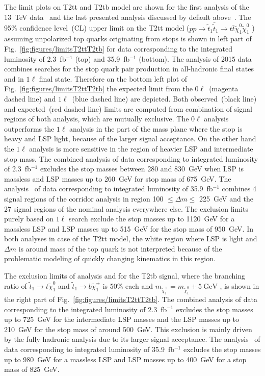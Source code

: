 The limit plots on T2tt and T2tb model are shown for the first analysis of the 13~TeV data~\cite{Sirunyan:2016jpr} and the last presented analysis discussed by default above~\cite{Sirunyan:2017xse}. The 95\% confidence level~(CL) upper limit on the T2tt model ($ pp \to \tilde{t}_{1} \bar{\tilde{t}}_{1} \to t \bar{t} \tilde{\chi}^{0}_{1} \tilde{\chi}^{0}_{1}$ ) assuming unpolarized top quarks originating from stops is shown in left part of Fig.~\ref{fig:figures/limitsT2ttT2tb} for data corresponding to the integrated luminosity of 2.3~fb$^{-1}$ (top) and 35.9~fb$^{-1}$ (bottom). The analysis of 2015 data~\cite{Sirunyan:2016jpr} combines searches for the stop quark pair production in all-hadronic final states and in $1\ell$ final state. Therefore on the bottom left plot of Fig.~\ref{fig:figures/limitsT2ttT2tb} the expected limit from the $0\ell$~(magenta dashed line) and $1\ell$~(blue dashed line) are depicted. Both observed~(black line) and expected~(red dashed line) limits are computed from combination of signal regions of both analysis, which are mutually exclusive. The $0\ell$ analysis outperforms the $1\ell$ analysis in the part of the mass plane where the stop is heavy and LSP light, because of the larger signal acceptance. On the other hand the $1\ell$ analysis is more sensitive in the region of heavier LSP and intermediate stop mass. The combined analysis of data corresponding to integrated luminosity of 2.3~fb$^{-1}$ excludes the stop masses between 280 and 830~GeV when LSP is massless and LSP masses up to 260~GeV for stop mass of 675~GeV. The analysis~\cite{Sirunyan:2017xse} of data corresponding to integrated luminosity of 35.9~fb$^{-1}$ combines 4 signal regions of the corridor analysis in region 100 $\leq \Delta m \leq $ 225~GeV and the 27 signal regions of the nominal analysis everywhere else. The exclusion limits purely based on $1\ell$ search exclude  the stop masses up to 1120~GeV for a massless LSP and LSP masses up to 515~GeV for the stop mass of 950~GeV. In both analyses in case of the T2tt model, the white region where LSP is light and $\Delta m$ is around mass of the top quark is not interpreted because of the problematic modeling of quickly changing kinematics in this region.

The exclusion limits of analysis \cite{Sirunyan:2016jpr} and  \cite{Sirunyan:2017xse} for the T2tb signal, where the branching ratio of $ \tilde{t}_{1} \to t  \tilde{\chi}^{0}_{1} $ and $ \tilde{t}_{1} \to b  \tilde{\chi}^{\pm}_{1} $  is 50\% each and $m_{\tilde{\chi}_{1}^{\pm}} = m_{\tilde{\chi}_{1}^{0}} + 5~\mathrm{GeV}$ , is shown in the right part of Fig.~\ref{fig:figures/limitsT2ttT2tb}. The combined analysis of data corresponding to the integrated luminosity of 2.3~fb$^{-1}$ excludes the stop masses up to 725~GeV for the intermediate LSP masses and the LSP masses up to 210~GeV for the stop mass of around 500~GeV. This exclusion is mainly driven by the fully hadronic analysis due to its larger signal acceptance. The analysis~\cite{Sirunyan:2017xse} of data corresponding to integrated luminosity of 35.9~fb$^{-1}$ excludes the stop masses up to 980~GeV for a massless LSP and LSP masses up to 400~GeV for a stop mass of 825~GeV. 

